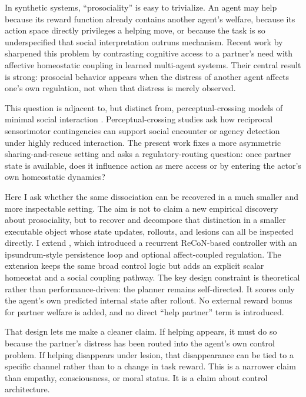 \documentclass[letterpaper]{article}
\begin{document}
In synthetic systems, ``prosociality'' is easy to trivialize. An agent may help because its reward function already contains another agent's welfare, because its action space directly privileges a helping move, or because the task is so underspecified that social interpretation outruns mechanism. Recent work by \citet{YoshidaMan2025HomeostaticCoupling} sharpened this problem by contrasting cognitive access to a partner's need with affective homeostatic coupling in learned multi-agent systems. Their central result is strong: prosocial behavior appears when the distress of another agent affects one's own regulation, not when that distress is merely observed.

This question is adjacent to, but distinct from, perceptual-crossing models of minimal social interaction \citep{AuvrayLenayStewart2009PerceptualCrossing,FroeseIizukaIkegami2014EmbodiedSocialInteraction}. Perceptual-crossing studies ask how reciprocal sensorimotor contingencies can support social encounter or agency detection under highly reduced interaction. The present work fixes a more asymmetric sharing-and-rescue setting and asks a regulatory-routing question: once partner state is available, does it influence action as mere access or by entering the actor's own homeostatic dynamics?

Here I ask whether the same dissociation can be recovered in a much smaller and more inspectable setting. The aim is not to claim a new empirical discovery about prosociality, but to recover and decompose that distinction in a smaller executable object whose state updates, rollouts, and lesions can all be inspected directly. I extend \citet{Sanyal2026ReCoNIpsundrum}, which introduced a recurrent ReCoN-based controller with an ipsundrum-style persistence loop and optional affect-coupled regulation. The extension keeps the same broad control logic but adds an explicit scalar homeostat and a social coupling pathway. The key design constraint is theoretical rather than performance-driven: the planner remains self-directed. It scores only the agent's own predicted internal state after rollout. No external reward bonus for partner welfare is added, and no direct ``help partner'' term is introduced.

That design lets me make a cleaner claim. If helping appears, it must do so because the partner's distress has been routed into the agent's own control problem. If helping disappears under lesion, that disappearance can be tied to a specific channel rather than to a change in task reward. This is a narrower claim than empathy, consciousness, or moral status. It is a claim about control architecture.
\end{document}

